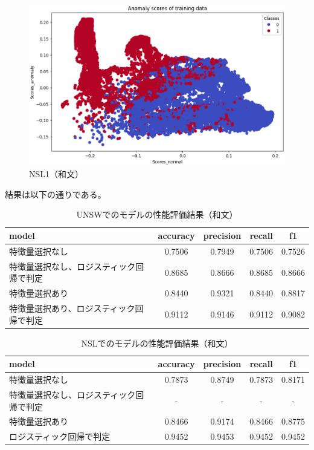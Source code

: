 \documentclass{css}
\begin{document}
\begin{figure}[tb]
    \centering
    \includegraphics[width=\linewidth]{pictures/eps/NSL1.eps}
    \caption{NSL1（和文）}
    \label{fig:NSL1}
\end{figure}

結果は以下の通りである。

\begin{table}[tb]
    \caption{UNSWでのモデルの性能評価結果（和文）}
    \centering
    \footnotesize
    \begin{tabular}{lcccc}
        \hline\hline
        model & accuracy & precision & recall & f1 \\
        \hline
        特徴量選択なし & 0.7506 & 0.7949 & 0.7506 & 0.7526 \\
        特徴量選択なし、ロジスティック回帰で判定 & 0.8685 &  0.8666 & 0.8685 & 0.8666 \\
        特徴量選択あり & 0.8440 & 0.9321 & 0.8440 & 0.8817 \\
        特徴量選択あり、ロジスティック回帰で判定 & 0.9112 & 0.9146 & 0.9112 & 0.9082 \\
        \hline
    \end{tabular}
    \label{tab:model_performance}
\end{table}

\begin{table}[tb]
    \caption{NSLでのモデルの性能評価結果（和文）}
    \centering
    \footnotesize
    \begin{tabular}{lcccc}
        \hline\hline
        model & accuracy & precision & recall & f1 \\
        \hline
        特徴量選択なし & 0.7873 & 0.8749 & 0.7873 & 0.8171 \\
        特徴量選択なし、ロジスティック回帰で判定 & - & - & - & -\\ 
        特徴量選択あり & 0.8466 & 0.9174 & 0.8466 & 0.8775 \\
        ロジスティック回帰で判定 & 0.9452 & 0.9453 & 0.9452 & 0.9452 \\
        \hline
    \end{tabular}
    \label{tab:model_performance}
\end{table}
\end{document}
